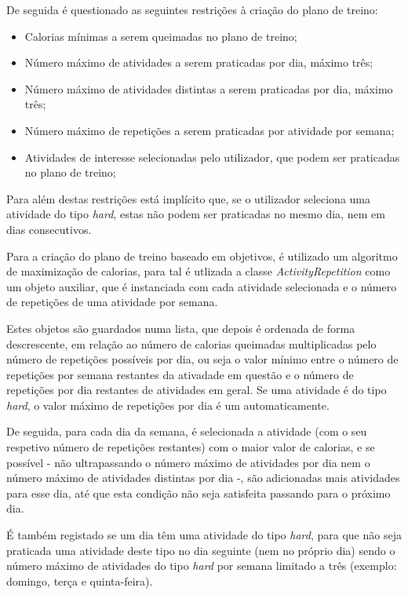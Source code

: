 \documentclass[a4paper,12pt]{scrreprt}
\begin{document}
    De seguida é questionado as seguintes restrições à criação do plano de treino:
    \begin{itemize}
        \item Calorias mínimas a serem queimadas no plano de treino;
        \item Número máximo de atividades a serem praticadas por dia, máximo três;
        \item Número máximo de atividades distintas a serem praticadas por dia, máximo três;
        \item Número máximo de repetições a serem praticadas por atividade por semana;
        \item Atividades de interesse selecionadas pelo utilizador, que podem ser praticadas no plano de treino;
    \end{itemize}

    Para além destas restrições está implícito que, se o utilizador seleciona uma atividade do tipo \textit{hard},
    estas não podem ser praticadas no mesmo dia, nem em dias consecutivos.

    Para a criação do plano de treino baseado em objetivos, é utilizado um algoritmo de maximização de calorias,
    para tal é utlizada a classe \textit{ActivityRepetition} como um objeto auxiliar,
    que é instanciada com cada atividade selecionada e o número de repetições de uma atividade por semana.

    Estes objetos são guardados numa lista, que depois é ordenada de forma descrescente,
    em relação ao número de calorias queimadas multiplicadas pelo número de repetições possíveis por dia,
    ou seja o valor mínimo entre o número de repetições por semana restantes da ativadade em questão e o
    número de repetições por dia restantes de atividades em geral. Se uma atividade é do tipo \textit{hard},
    o valor máximo de repetições por dia é um automaticamente.

    De seguida, para cada dia da semana, é selecionada a atividade (com o seu respetivo número de repetições restantes)
    com o maior valor de calorias, e se possível - não ultrapassando o número máximo de atividades por dia
    nem o número máximo de atividades distintas por dia -,
    são adicionadas mais atividades para esse dia, até que esta condição não seja satisfeita passando para o próximo dia.

    É também registado se um dia têm uma atividade do tipo \textit{hard},
    para que não seja praticada uma atividade deste tipo no dia seguinte (nem no próprio dia)
    sendo o número máximo de atividades do tipo \textit{hard} por semana limitado a três
    (exemplo: domingo, terça e quinta-feira).
\end{document}

